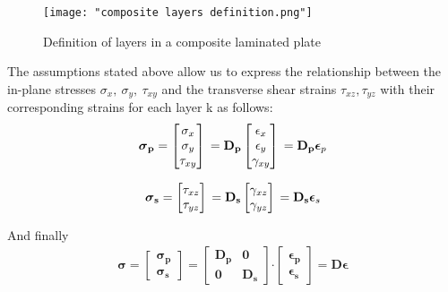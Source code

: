 \begin{figure}[h]
    \centering
    \texttt{[image: "composite layers definition.png"]}
    \caption{Definition of layers in a composite laminated plate \cite{onate2013}}
    \label{fig:composite_layers}
\end{figure}


The assumptions stated above allow us to express the relationship
between the in-plane stresses $\sigma_{x},\ \sigma_{y},\ \tau_{xy}$
and the transverse shear strains $\tau_{xz},\tau_{yz}$ with their
corresponding strains for each layer k as follows:
\begin{equation}
    \boldsymbol{\sigma}_{\mathbf{p}} =
    \begin{bmatrix}
        \sigma_{x} \\
        \sigma_{y} \\
        \tau_{xy}
    \end{bmatrix} \\
    = \mathbf{D_p}
    \begin{bmatrix}
        \epsilon_{x} \\
        \epsilon_{y} \\
        \gamma_{xy}
    \end{bmatrix} \\
    = \mathbf{D_p} \boldsymbol{\epsilon}_{p}
\end{equation}
    

\begin{equation}
    \boldsymbol{\sigma}_{\mathbf{s}} = \begin{bmatrix}
    \tau_{xz} \\
    \tau_{yz}
    \end{bmatrix} \\
    = \mathbf{D}_{\mathbf{s}} \begin{bmatrix}
    \gamma_{xz} \\
    \gamma_{yz}
    \end{bmatrix} \\
    = \mathbf{D}_{\mathbf{s}} \boldsymbol{\epsilon}_{s}
    \end{equation}
    

And finally
\begin{equation}
\begin{array}{r}
\boldsymbol{\sigma}=\begin{bmatrix}
\boldsymbol{\sigma_p} \\
\boldsymbol{\sigma_s}
\end{bmatrix}=\begin{bmatrix}
\mathbf{D}_{\mathbf{p}} & \mathbf{0} \\
\mathbf{0} & \mathbf{D_s}
\end{bmatrix}\mathbf{\cdot}\begin{bmatrix}
\boldsymbol{\epsilon_{p}} \\
\boldsymbol{\epsilon}_{\mathbf{s}}
\end{bmatrix}=\boldsymbol{D\epsilon}
\end{array}
\end{equation}



